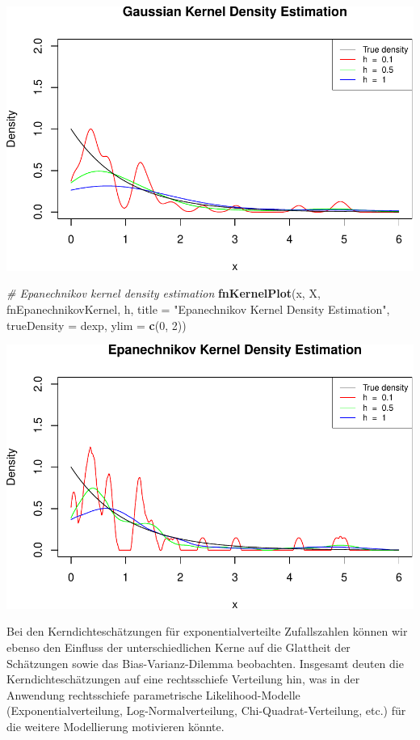 \documentclass[10pt,]{article}
\newenvironment{Shaded}{\begin{snugshade}}{\end{snugshade}}
\newcommand{\KeywordTok}[1]{\textcolor[rgb]{0.13,0.29,0.53}{\textbf{{#1}}}}
\newcommand{\DataTypeTok}[1]{\textcolor[rgb]{0.13,0.29,0.53}{{#1}}}
\newcommand{\DecValTok}[1]{\textcolor[rgb]{0.00,0.00,0.81}{{#1}}}
\newcommand{\StringTok}[1]{\textcolor[rgb]{0.31,0.60,0.02}{{#1}}}
\newcommand{\CommentTok}[1]{\textcolor[rgb]{0.56,0.35,0.01}{\textit{{#1}}}}
\newcommand{\NormalTok}[1]{{#1}}
\begin{document}
\includegraphics{project2_files/figure-latex/Kernel density estimation for the exponential-2.pdf}

\begin{Shaded}
\begin{Highlighting}[]
\CommentTok{# Epanechnikov kernel density estimation}
\KeywordTok{fnKernelPlot}\NormalTok{(x, X, fnEpanechnikovKernel, h, }
             \DataTypeTok{title =} \StringTok{"Epanechnikov Kernel Density Estimation"}\NormalTok{,}
             \DataTypeTok{trueDensity =} \NormalTok{dexp, }\DataTypeTok{ylim =} \KeywordTok{c}\NormalTok{(}\DecValTok{0}\NormalTok{, }\DecValTok{2}\NormalTok{))}
\end{Highlighting}
\end{Shaded}

\includegraphics{project2_files/figure-latex/Kernel density estimation for the exponential-3.pdf}

Bei den Kerndichteschätzungen für exponentialverteilte Zufallszahlen
können wir ebenso den Einfluss der unterschiedlichen Kerne auf die
Glattheit der Schätzungen sowie das Bias-Varianz-Dilemma beobachten.
Insgesamt deuten die Kerndichteschätzungen auf eine rechtsschiefe
Verteilung hin, was in der Anwendung rechtsschiefe parametrische
Likelihood-Modelle (Exponentialverteilung, Log-Normalverteilung,
Chi-Quadrat-Verteilung, etc.) für die weitere Modellierung motivieren
könnte.
\end{document}
